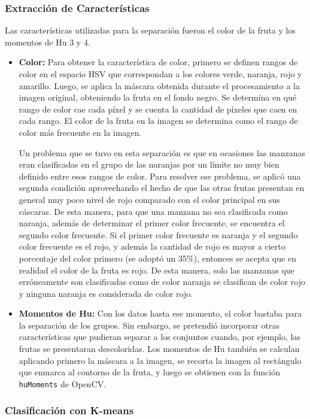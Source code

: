 \documentclass[a4paper, 12pt]{article}
\begin{document}
\subsubsection{Extracción de Características}
Las características utilizadas para la separación fueron el color de la fruta y los momentos de Hu 3 y 4.
\begin{itemize}
    \item \textbf{Color:} Para obtener la característica de color, primero se definen rangos de color en el espacio HSV que correspondan a los colores verde, naranja, rojo y amarillo. Luego, se aplica la máscara obtenida durante el procesamiento a la imagen original, obteniendo la fruta en el fondo negro. Se determina en qué rango de color cae cada píxel y se cuenta la cantidad de píxeles que caen en cada rango. El color de la fruta en la imagen se determina como el rango de color más frecuente en la imagen.
    
    Un problema que se tuvo en esta separación es que en ocasiones las manzanas eran clasificadas en el grupo de las naranjas por un límite no muy bien definido entre esos rangos de color. Para resolver ese problema, se aplicó una segunda condición aprovechando el hecho de que las otras frutas presentan en general muy poco nivel de rojo comparado con el color principal en sus cáscaras. De esta manera, para que una manzana no sea clasificada como naranja, además de determinar el primer color frecuente, se encuentra el segundo color frecuente. Si el primer color frecuente es naranja y el segundo color frecuente es el rojo, y además la cantidad de rojo es mayor a cierto porcentaje del color primero (se adoptó un 35\%), entonces se acepta que en realidad el color de la fruta es rojo. De esta manera, solo las manzanas que erróneamente son clasificadas como de color naranja se clasifican de color rojo y ninguna naranja es considerada de color rojo.
    
    \item \textbf{Momentos de Hu:} Con los datos hasta ese momento, el color bastaba para la separación de los grupos. Sin embargo, se pretendió incorporar otras características que pudieran separar a los conjuntos cuando, por ejemplo, las frutas se presentaran descoloridas. Los momentos de Hu también se calculan aplicando primero la máscara a la imagen, se recorta la imagen al rectángulo que enmarca al contorno de la fruta, y luego se obtienen con la función \texttt{huMoments} de OpenCV.
\end{itemize}
\subsubsection{Clasificación con K-means}
\end{document}
